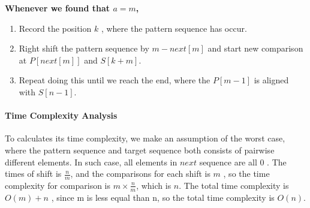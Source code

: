 \begin{questions}
\begin{itemize}
        \textbf{Whenever we found that $a = m$,}
        \begin{enumerate}
            \item Record the position $k$ , where the pattern sequence has occur.
            \item Right shift the pattern sequence by $m-next[m]$ and start new comparison at $P[next[m]]$ and $S[k+m]$.
            \item Repeat doing this until we reach the end, where the $P[m-1]$ is aligned with $S[n-1]$.
        \end{enumerate}
    \end{itemize}

    \paragraph{Time Complexity Analysis}To calculates its time complexity, we make an assumption of the worst case, where the pattern sequence and target sequence both consists of pairwise different elements. In such case, all elements in $next$ sequence are all $0$ . The times of shift is $\frac{n}{m}$, and the comparisons for each shift is $m$ , so the time complexity for comparison is $m\times\frac{n}{m} $, which is $n$. The total time complexity is $O(m)+n$ , since m is less equal than n, so the total time complexity is $O(n)$.

\end{questions}

